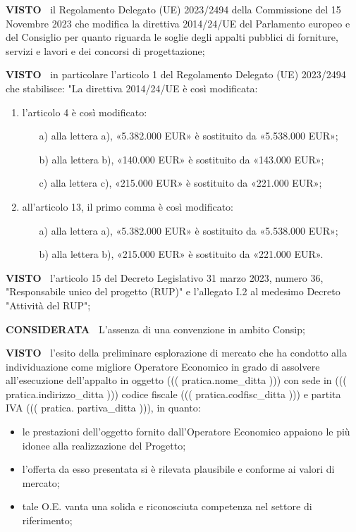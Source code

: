 \textbf{VISTO~} il Regolamento Delegato (UE)
2023/2494 della Commissione del 15 Novembre 2023 che modifica la direttiva
2014/24/UE del Parlamento europeo e del Consiglio per quanto riguarda
le soglie degli appalti pubblici di forniture, servizi e lavori e dei
concorsi di progettazione;

\textbf{VISTO~}  in particolare l’articolo 1 del Regolamento Delegato (UE)
2023/2494 che stabilisce: "La direttiva 2014/24/UE è così modificata: 

\begin{enumerate}
\item l’articolo 4 è così modificato: 
\begin{enumerate}
\item[a)]  alla lettera a), «5.382.000 EUR» è sostituito da «5.538.000 EUR»;
\item[b)]  alla lettera b), «140.000 EUR» è sostituito da «143.000 EUR»; 
\item[c)]  alla lettera c), «215.000 EUR» è sostituito da «221.000 EUR»; 
\end{enumerate}

\item all’articolo 13, il primo comma è così modificato: 
\begin{enumerate}
\item[a)]  alla lettera a), «5.382.000 EUR» è sostituito da «5.538.000 EUR»; 
\item[b)]  alla lettera b), «215.000 EUR» è sostituito da «221.000 EUR».
\end{enumerate}
\end{enumerate}

\textbf{VISTO~} l’articolo 15 del Decreto Legislativo 31
marzo 2023, numero 36, "Responsabile unico del progetto (RUP)" e
l’allegato I.2 al medesimo Decreto "Attività del RUP";

\textbf{CONSIDERATA~} L'assenza di una convenzione in ambito Consip;


\textbf{VISTO~} l’esito della preliminare
esplorazione di mercato che ha condotto alla individuazione come migliore
Operatore Economico in grado di assolvere all’esecuzione dell’appalto
in oggetto ((( pratica.nome_ditta ))) con sede in ((( pratica.indirizzo_ditta )))
codice fiscale ((( pratica.codfisc_ditta ))) e partita IVA ((( pratica. partiva_ditta ))),
in quanto:

\begin{itemize}
\item  le prestazioni dell’oggetto fornito dall’Operatore Economico
appaiono le più idonee alla realizzazione del Progetto;

\item 
l’offerta da esso presentata si è rilevata plausibile e conforme
ai valori di mercato;

\item tale O.E. vanta una solida e riconosciuta
competenza nel settore di riferimento;

\end{itemize}

